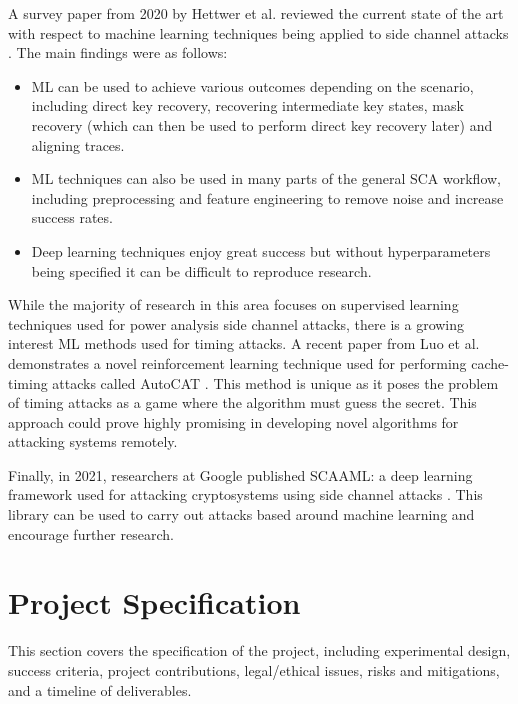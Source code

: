 \documentclass[a4paper,oneside,11pt]{article}
\begin{document}
A survey paper from 2020 by Hettwer et al. reviewed the current state of the
art with respect to machine learning techniques being applied to side channel
attacks \cite{A/Hettwer-2020-SCAML-Survey}. The main findings were as follows:

\begin{itemize}
	\item{ML can be used to achieve various outcomes depending on the
		scenario, including direct key recovery, recovering
		intermediate key states, mask recovery (which can then be used
		to perform direct key recovery later) and aligning traces.}
	\item{ML techniques can also be used in many parts of the general SCA
		workflow, including preprocessing and feature engineering to
		remove noise and increase success rates.}
	\item{Deep learning techniques enjoy great success but without
		hyperparameters being specified it can be difficult to
		reproduce research.}
\end{itemize}

While the majority of research in this area focuses on supervised learning
techniques used for power analysis side channel attacks, there is a growing
interest ML methods used for timing attacks. A recent paper from Luo et al.
demonstrates a novel reinforcement learning technique used for performing
cache-timing attacks called AutoCAT \cite{A/Luo-2023-AutoCAT}. This method is
unique as it poses the problem of timing attacks as a game where the algorithm
must guess the secret. This approach could prove highly promising in developing
novel algorithms for attacking systems remotely.

Finally, in 2021, researchers at Google published SCAAML: a deep learning
framework used for attacking cryptosystems using side channel attacks
\cite{W/SCAAML, A/Bursztein-2023-DL}. This library can be used to carry out
attacks based around machine learning and encourage further research.




\section{Project Specification}
\label{sec:project-specification}

This section covers the specification of the project, including experimental
design, success criteria, project contributions, legal/ethical issues, risks
and mitigations, and a timeline of deliverables.
\end{document}
